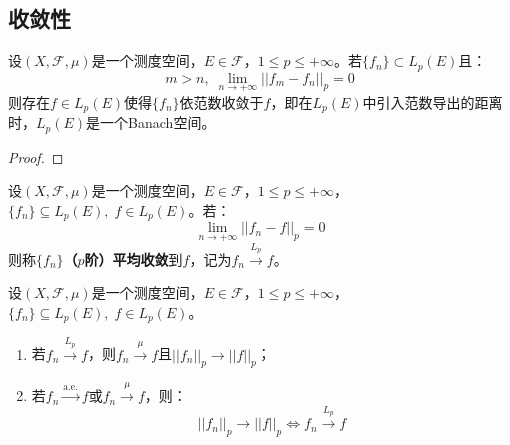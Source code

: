 \subsection{收敛性}
\begin{theorem}\label{theo:LpBanach}
	设$(X,\mathscr{F},\mu)$是一个测度空间，$E\in\mathscr{F}$，$1\leqslant p\leqslant+\infty$。若$\{f_n\}\subset L_p(E)$且：
	\begin{equation*}
		m>n,\;\lim_{n\to+\infty}||f_m-f_n||_p=0
	\end{equation*}
	则存在$f\in L_p(E)$使得$\{f_n\}$依范数收敛于$f$，即在$L_p(E)$中引入范数导出的距离时，$L_p(E)$是一个Banach空间。
\end{theorem}
\begin{proof}
	
\end{proof}
\begin{definition}
	设$(X,\mathscr{F},\mu)$是一个测度空间，$E\in\mathscr{F}$，$1\leqslant p\leqslant+\infty$，$\{f_n\}\subseteq L_p(E),\;f\in L_p(E)$。若：
	\begin{equation*}
		\lim_{n\to+\infty}||f_n-f||_p=0
	\end{equation*}
	则称$\{f_n\}$\textbf{（$p$阶）平均收敛}到$f$，记为$f_n\overset{L_p}{\longrightarrow}f$。
\end{definition}
\begin{theorem}
	设$(X,\mathscr{F},\mu)$是一个测度空间，$E\in\mathscr{F}$，$1\leqslant p\leqslant+\infty$，$\{f_n\}\subseteq L_p(E),\;f\in L_p(E)$。
	\begin{enumerate}
		\item 若$f_n\overset{L_p}{\longrightarrow}f$，则$f_n\overset{\mu}{\longrightarrow}f$且$||f_n||_p\to||f||_p$；
		\item 若$f_n\overset{\text{a.e.}}{\longrightarrow}f$或$f_n\overset{\mu}{\longrightarrow}f$，则：
		\begin{equation*}
			||f_n||_p\to||f||_p\Leftrightarrow f_n\overset{L_p}{\longrightarrow}f
		\end{equation*}
	\end{enumerate}
\end{theorem}

